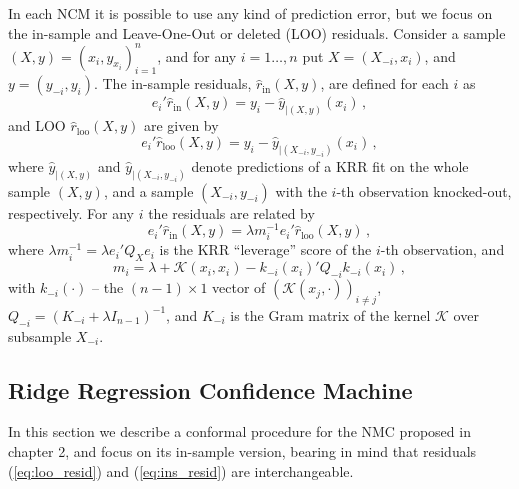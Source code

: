 \documentclass[10pt, conference, compsocconf]{IEEEtran}
\newcommand{\Kcal}{\mathcal{K}}
\begin{document}
In each NCM it is possible to use any kind of prediction error, but we focus on
the in-sample and Leave-One-Out or deleted (LOO) residuals. Consider a sample
$(X, y) = (x_i, y_{x_i})_{i=1}^n$, and for any $i=1\ldots, n$ put $X = (X_{-i}, x_i)$,
and $y = (y_{-i}, y_i)$. The in-sample residuals, $\hat{r}_{\text{in}}(X, y)$,
are defined for each $i$ as
\begin{equation} \label{eq:ins_resid}
  e_i' \hat{r}_{\text{in}}(X, y) = y_i - \hat{y}_{|(X, y)}(x_i) \,,
\end{equation}
and LOO $\hat{r}_{\text{loo}}(X, y)$ are given by
\begin{equation} \label{eq:loo_resid}
  e_i' \hat{r}_{\text{loo}}(X, y) = y_i - \hat{y}_{|(X_{-i}, y_{-i})}(x_i) \,,
\end{equation}
where $\hat{y}_{|(X, y)}$ and $\hat{y}_{|(X_{-i}, y_{-i})}$ denote predictions of
a KRR fit on the whole sample $(X, y)$, and a sample $(X_{-i}, y_{-i})$ with the
$i$-th observation knocked-out, respectively. For any $i$ the residuals are related
by
\begin{equation}
  e_i' \hat{r}_{\text{in}}(X, y)
    = \lambda m_i^{-1} e_i' \hat{r}_{\text{loo}}(X, y)
    \,,
\end{equation}
where $\lambda m_i^{-1} = \lambda e_i'Q_X e_i$ is the KRR ``leverage'' score of
the $i$-th observation, and
\begin{equation} \label{eq:krr_leverage}
  m_i = \lambda + \Kcal(x_i, x_i) - k_{-i}(x_i)' Q_{-i} k_{-i}(x_i) \,,
\end{equation}
with $k_{-i}(\cdot)$ -- the $(n-1)\times 1$ vector of $(\Kcal(x_j, \cdot))_{i\neq j}$,
$Q_{-i} = (K_{-i} + \lambda I_{n-1})^{-1}$, and $K_{-i}$ is the Gram matrix of
the kernel $\Kcal$ over subsample $X_{-i}$.


\subsection{Ridge Regression Confidence Machine} %
\label{sub:ridge_regression_confidence_machine}

In this section we describe a conformal procedure for the NMC proposed in \cite{vovk2005}
chapter 2, and focus on its in-sample version, bearing in mind that residuals
(\ref{eq:loo_resid}) and (\ref{eq:ins_resid}) are interchangeable.
\end{document}

